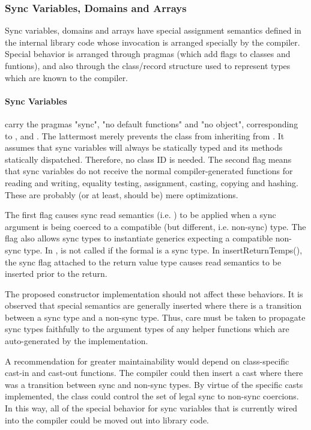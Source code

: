 \subsubsection{Sync Variables, Domains and Arrays} 

Sync variables, domains and arrays have special assignment semantics defined
in the internal library code whose invocation is arranged specially by the
compiler.  Special behavior is arranged through pragmas (which add flags to classes and
funtions), and also through the class/record structure used to represent types
which are known to the compiler.  

\paragraph{Sync Variables} carry the pragmas "sync", "no default functions" and "no object",
corresponding to ,  and .  The
lattermost merely prevents the  class from inheriting from .  It
assumes that sync variables will always be statically typed and its methods
statically dispatched.  Therefore, no class ID is needed.  The second flag means
that sync variables do not receive the normal compiler-generated functions for
reading and writing, equality testing, assignment, casting, copying and
hashing.  These are probably (or at least, should be) mere optimizations.

The first flag causes sync read semantics (i.e. ) to be applied
when a sync argument is being coerced to a compatible (but different,
i.e. non-sync) type.  The flag also allows sync types to instantiate generics
expecting a compatible non-sync type.  In ,  is
not called if the formal is a sync type.  In insertReturnTemps(), the sync flag
attached to the return value type causes read semantics to be inserted prior to
the return.

The proposed constructor implementation should not affect these behaviors.  It is
observed that special semantics are generally inserted where there is a
transition between a sync type and a non-sync type.  Thus, care must be taken to
propagate sync types faithfully to the argument types of any helper functions
which are auto-generated by the implementation.  

A recommendation for greater maintainability would depend on class-specific
cast-in and cast-out functions.  The compiler could then insert a cast where
there was a transition between sync and non-sync types.  By virtue of the
specific casts implemented, the class could control the set of legal sync to
non-sync coercions.  In this way, all of the special behavior for sync variables
that is currently wired into the compiler could be moved out into library code.

